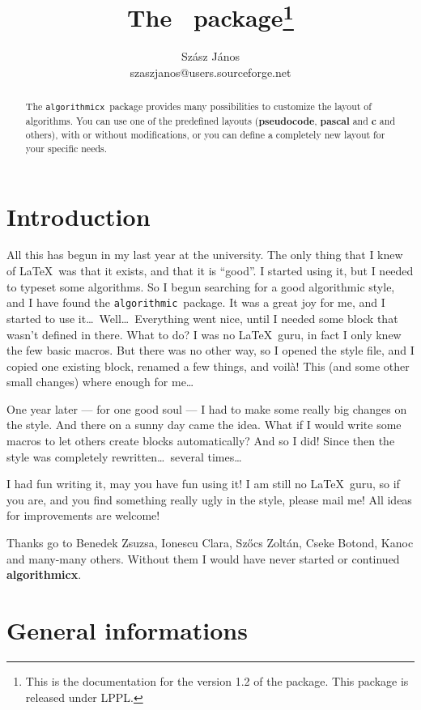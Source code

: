 \documentclass{article}
\title{The \alg\ package\footnote{This is the documentation for the version 1.2
of the package. This package is released under LPPL.}}
\author{Sz\'asz J\'anos\\szaszjanos@users.sourceforge.net}
\newcommand{\alg}{\texttt{algorithmicx}}
\newcommand{\old}{\texttt{algorithmic}}
\begin{document}
\maketitle
\begin{abstract}
The \alg\ package provides many possibilities to customize the layout of algorithms. 
You can use one of the predefined layouts (\textbf{pseudocode}, \textbf{pascal} 
and \textbf{c} and others), with or without modifications, or you can define a 
completely new layout for your specific needs.
\end{abstract}
\tableofcontents

\section{Introduction}
All this has begun in my last year at the university. The only thing that I knew of 
\LaTeX\ was that it exists, and that it is ``good''. I started using it, but I needed to typeset some 
algorithms. So I begun searching for a good algorithmic style, and I have found the \old\ package. 
It was a great joy for me, and I started to use it\dots\ 
Well\dots\ Everything went nice, until I needed some block that wasn't defined in there. What to do? 
I was no \LaTeX\ guru, in fact I only knew the few basic macros. But there was no other way, so I opened 
the style file, and I copied one existing block, renamed a few things, and voil\`a! This (and some other 
small changes) where enough for me\dots

One year later --- for one good soul --- I had to make some really big changes on the style. And there on 
a sunny day came the idea. What if I would write some macros to let others create blocks automatically? 
And so I did! Since then the style was completely rewritten\dots\ several times\dots

I had fun writing it, may you have fun using it! I am still no \LaTeX\ guru, so if you are, and you find 
something really ugly in the style, please mail me! All ideas for improvements are welcome!

Thanks go to Benedek Zsuzsa, Ionescu Clara, Sz\H ocs Zolt\'an, Cseke Botond, Kanoc 
and many-many others. Without them I would have never started or continued \textbf{algorithmicx}.

\section{General informations}
\end{document}
